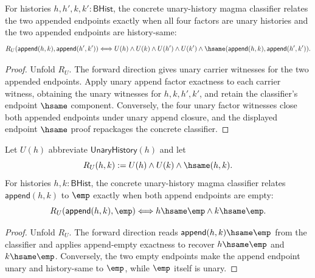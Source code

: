 \begin{theorem}
\label{thm:concrete-unary-history-magma-classifier-append-factors}
For histories $h,h',k,k':\mathsf{BHist}$, the concrete unary-history magma
classifier relates the two appended endpoints exactly when all four factors
are unary histories and the two appended endpoints are history-same:
$$
R_U(\mathsf{append}(h,k),\mathsf{append}(h',k'))
\Longleftrightarrow
U(h)\land U(k)\land U(h')\land U(k')
\land
\hsame(\mathsf{append}(h,k),\mathsf{append}(h',k')).
$$
\end{theorem}
\begin{proof}
Unfold $R_U$. The forward direction gives unary carrier witnesses for the two
appended endpoints. Apply unary append factor exactness to each carrier
witness, obtaining the unary witnesses for $h,k,h',k'$, and retain the
classifier's endpoint $\hsame$ component. Conversely, the four unary factor
witnesses close both appended endpoints under unary append closure, and the
displayed endpoint $\hsame$ proof repackages the concrete classifier.
\end{proof}

\begin{theorem}
\label{thm:concrete-unary-history-magma-classifier-append-empty-endpoints}
Let $U(h)$ abbreviate $\mathsf{UnaryHistory}(h)$ and let
$$
R_U(h,k):=U(h)\land U(k)\land\hsame(h,k).
$$
For histories $h,k:\mathsf{BHist}$, the concrete unary-history magma
classifier relates $\mathsf{append}(h,k)$ to $\emp$ exactly when both append
endpoints are empty:
$$
R_U(\mathsf{append}(h,k),\emp)
\Longleftrightarrow
h\hsame\emp\land k\hsame\emp.
$$
\end{theorem}
\begin{proof}
Unfold $R_U$. The forward direction reads
$\mathsf{append}(h,k)\hsame\emp$ from the classifier and applies append-empty
exactness to recover $h\hsame\emp$ and $k\hsame\emp$. Conversely, the two empty
endpoints make the append endpoint unary and history-same to $\emp$, while
$\emp$ itself is unary.
\end{proof}

